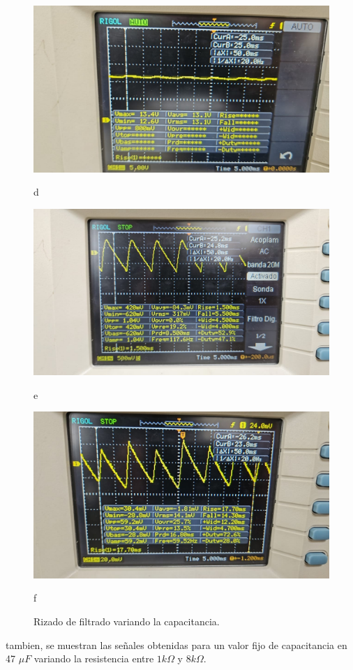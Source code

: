 \documentclass[10pt,letterpaper]{article}
\begin{document}
\begin{figure}[H]
    \hfill
    \begin{minipage}[b]{0.45\textwidth}
        \centering
        \includegraphics[scale=0.2]{Filtrado9.jpg}
        \caption*{d}
    \end{minipage}
    \hfill
        \begin{minipage}[b]{0.45\textwidth}
        \centering
        \includegraphics[scale=0.2]{Filtrado4.jpg}
        \caption*{e}
    \end{minipage}
    \hfill
        \begin{minipage}[b]{0.45\textwidth}
        \centering
        \includegraphics[scale=0.2]{Filtrado5.jpg}
        \caption*{f}
    \end{minipage}
    \caption{Rizado de filtrado variando la capacitancia.}
    \label{fig:cuadricula}
\end{figure}
tambien,
se muestran las señales obtenidas para un valor fijo de capacitancia en 47 $\mu F$
variando 
la resistencia entre $1k\Omega$ y $8k\Omega$.
\end{document}
